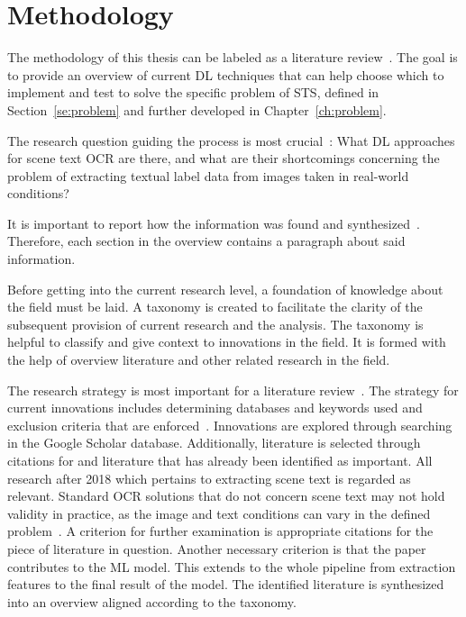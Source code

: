 \section{Methodology}\label{se:methodology}
The methodology of this thesis can be labeled as a literature review~\citep{snyder_literature_2019,
torraco_writing_2005}.
The goal is to provide an overview of current \ac{DL} techniques that can help choose
which to implement and test to solve the specific problem of \ac{STS}, defined in
Section~\ref{se:problem} and further developed in Chapter~\ref{ch:problem}.

The research question guiding the process is most crucial~\citep{snyder_literature_2019}:
What \ac{DL} approaches for scene text \ac{OCR} are there, and what are their shortcomings concerning
the problem of extracting textual label data from images taken in real-world conditions?

It is important to report how the information was found and
synthesized~\citep{torraco_writing_2005}.
Therefore, each section in the overview contains a paragraph about said information.

Before getting into the current research level, a foundation of knowledge about the field must be
laid.
A taxonomy is created to facilitate the clarity of the subsequent provision of current research and
the analysis.
The taxonomy is helpful to classify and give context to innovations in the field.
It is formed with the help of overview literature and other related research in the field.

The research strategy is most important for a literature
review~\citep{snyder_literature_2019}.
The strategy for current innovations includes determining databases and keywords
used and exclusion criteria that are enforced~\citep{torraco_writing_2005}.
Innovations are explored through searching in the Google Scholar database.
Additionally, literature is selected through citations for and literature that has already been
identified as important.
All research after 2018 which pertains to extracting scene text is regarded as relevant.
Standard \ac{OCR} solutions that do not concern scene text may not hold validity in practice, as
the image and text conditions can vary in the defined problem~\citep{chen_text_2021}.
A criterion for further examination is appropriate citations for the piece of literature
in question.
Another necessary criterion is that the paper contributes to the \ac{ML} model.
This extends to the whole pipeline from extraction features to the final result of the model.
The identified literature is synthesized into an overview aligned according to the taxonomy.

